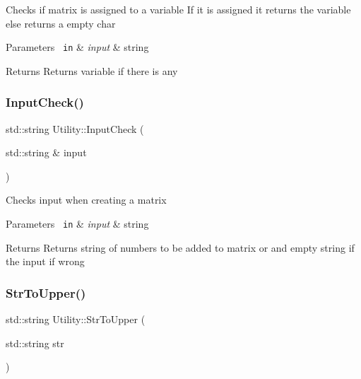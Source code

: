 Checks if matrix is assigned to a variable If it is assigned it returns the variable else returns a empty char 
\begin{DoxyParams}[1]{Parameters}
\mbox{\texttt{ in}}  & {\em input} & string \\
\hline
\end{DoxyParams}
\begin{DoxyReturn}{Returns}
Returns variable if there is any 
\end{DoxyReturn}
\mbox{\label{class_utility_a6ff9fad63d7a50296de8bdb927ac9cf3}} 
\subsubsection{\texorpdfstring{InputCheck()}{InputCheck()}}
{\footnotesize\ttfamily std\+::string Utility\+::\+Input\+Check (\begin{DoxyParamCaption}\item[{std\+::string \&}]{input }\end{DoxyParamCaption})\hspace{0.3cm}{\ttfamily [static]}}

Checks input when creating a matrix 
\begin{DoxyParams}[1]{Parameters}
\mbox{\texttt{ in}}  & {\em input} & string \\
\hline
\end{DoxyParams}
\begin{DoxyReturn}{Returns}
Returns string of numbers to be added to matrix or and empty string if the input if wrong 
\end{DoxyReturn}
\mbox{\label{class_utility_a63b0f47067e0b9dd1104ee27726c6f18}} 
\subsubsection{\texorpdfstring{StrToUpper()}{StrToUpper()}}
{\footnotesize\ttfamily std\+::string Utility\+::\+Str\+To\+Upper (\begin{DoxyParamCaption}\item[{std\+::string}]{str }\end{DoxyParamCaption})\hspace{0.3cm}{\ttfamily [static]}}

